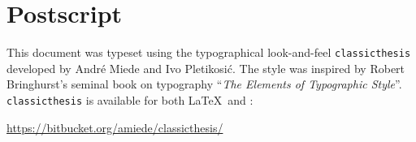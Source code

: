 \pagestyle{empty}

\hfill

\vfill


\section*{Postscript}
This document was typeset using the typographical look-and-feel \texttt{classicthesis} developed by Andr\'e Miede and Ivo Pletikosić.
The style was inspired by Robert Bringhurst's seminal book on typography ``\emph{The Elements of Typographic Style}''.
\texttt{classicthesis} is available for both \LaTeX\ and \mLyX:
\begin{center}
\url{https://bitbucket.org/amiede/classicthesis/}
\end{center}

\bigskip

\noindent\finalVersionString


%
%
